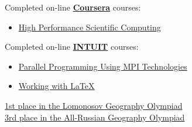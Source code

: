 \documentclass[a4paper,11pt]{article}
\begin{document}
\vspace{.1in}
Completed on-line \textbf{\href{https://www.coursera.org}{Coursera}} courses:
\begin{itemize}
        \item {\href{https://www.coursera.org/course/scicomp}{High Performance Scientific Computing}}
\end{itemize}

\vspace{.1in}
Completed on-line \textbf{\href{http://www.intuit.ru/en/node/32/}{INTUIT}} courses:
\begin{itemize}
        \item {\href{http://www.intuit.ru/sites/default/files/diploma/d/e/n/n/i/NOU__INTUIT_-2-699590-OLF.jpg}{Parallel Programming Using MPI Technologies}}
        \item {\href{http://www.intuit.ru/sites/default/files/diploma/d/e/n/n/i/Nekommercheskoe_obrazovatelnoe_chastnoe_uchrejdenie_vyisshego_professionalnogo__obrazovaniya__Natsionalnyiy_otkryityiy_universitet__INTUIT_-2-790692-OLF.jpg}{Working with LaTeX}}
\end{itemize}

\vspace{.1in}
\href{http://lomonosov.msu.ru/}{1st place in the Lomonosov Geography Olympiad} \\
\href{http://rosolymp.ru/index.php?option=com_content&view=article&id=6455&Itemid=917}{3rd place in the All-Russian Geography Olympiad}
\end{document}
